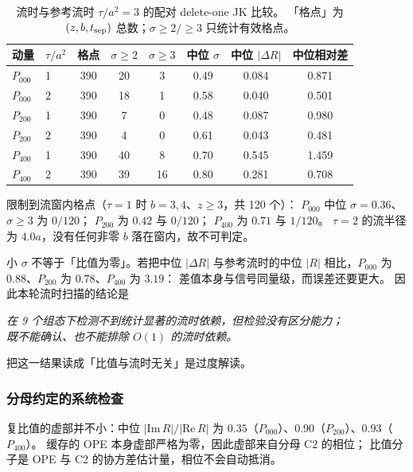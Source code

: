 \documentclass[UTF8,a4paper,11pt]{ctexart}
\begin{document}
\begin{table}[htbp]
\centering
\caption{流时与参考流时 $\tau/a^2=3$ 的配对 delete-one JK 比较。
「格点」为 $(z,b,t_{\rm sep})$ 总数；$\sigma\ge2/\ge3$ 只统计有效格点。}
\label{tab:flowscan}
\footnotesize
\setlength{\tabcolsep}{4pt}
\begin{tabular}{@{}llcccccc@{}}
\toprule
动量 & $\tau/a^2$ & 格点 & $\sigma\ge2$ & $\sigma\ge3$
 & 中位 $\sigma$ & 中位 $|\Delta R|$ & 中位相对差 \\
\midrule
$P_{000}$ & 1 & 390 & 20 & 3 & 0.49 & 0.084 & 0.871 \\
$P_{000}$ & 2 & 390 & 18 & 1 & 0.58 & 0.040 & 0.501 \\
$P_{200}$ & 1 & 390 & 7  & 0 & 0.48 & 0.087 & 0.980 \\
$P_{200}$ & 2 & 390 & 4  & 0 & 0.61 & 0.043 & 0.481 \\
$P_{400}$ & 1 & 390 & 40 & 8 & 0.70 & 0.545 & 1.459 \\
$P_{400}$ & 2 & 390 & 39 & 16 & 0.80 & 0.281 & 0.708 \\
\bottomrule
\end{tabular}
\end{table}

限制到流窗内格点（$\tau=1$ 时 $b=3,4$、$z\ge3$，共 120 个）：
$P_{000}$ 中位 $\sigma=0.36$、$\sigma\ge3$ 为 $0/120$；
$P_{200}$ 为 $0.42$ 与 $0/120$；
$P_{400}$ 为 $0.71$ 与 $1/120$。
$\tau=2$ 的流半径为 $4.0a$，没有任何非零 $b$ 落在窗内，故不可判定。

小 $\sigma$ 不等于「比值为零」。若把中位 $|\Delta R|$ 与参考流时的中位 $|R|$
相比，$P_{000}$ 为 $0.88$、$P_{200}$ 为 $0.78$、$P_{400}$ 为 $3.19$：
差值本身与信号同量级，而误差还要更大。
因此本轮流时扫描的结论是
\begin{center}
\emph{在 9 个组态下检测不到统计显著的流时依赖，但检验没有区分能力；\\
既不能确认、也不能排除 $O(1)$ 的流时依赖。}
\end{center}
把这一结果读成「比值与流时无关」是过度解读。

\subsubsection{分母约定的系统检查}

复比值的虚部并不小：中位 $|\mathrm{Im}\,R|/|\mathrm{Re}\,R|$ 为
$0.35$（$P_{000}$）、$0.90$（$P_{200}$）、$0.93$（$P_{400}$）。
缓存的 OPE 本身虚部严格为零，因此虚部来自分母 C2 的相位；
比值分子是 OPE 与 C2 的协方差估计量，相位不会自动抵消。
\end{document}
